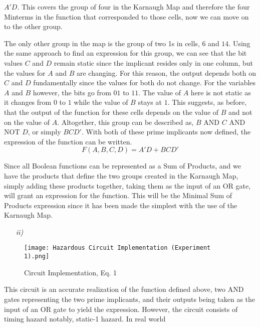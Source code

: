 \documentclass[12pt]{article}
\begin{document}
    $A'D$. This covers the group of four in the Karnaugh Map and therefore the
    four Minterms in the function that corresponded to those cells, now we can
    move on to the other group.
    \par The only other group in the map is the group of two 1s in cells, $6$
    and $14$. Using the same approach to find an expression for this group, we
    can see that the bit values $C$ and $D$ remain static since the implicant
    resides only in one column, but the values for $A$ and $B$ are changing. For
    this reason, the output depends both on $C$ and $D$ fundamentally since the
    values for both do not change. For the variables $A$ and $B$ however, the
    bits go from $01$ to $11$. The value of $A$ here is not static as it changes
    from $0$ to $1$ while the value of $B$ stays at $1$. This suggests, as
    before, that the output of the function for these cells depends on the value
    of $B$ and not on the value of $A$. Altogether, this group can be described
    as, $B$ AND $C$ AND NOT $D$, or simply $BCD'$. With both of these prime
    implicants now defined, the expression of the function can be written.
    \begin{equation}
        F\left(A,B,C,D \right) = A'D + BCD'
    \end{equation}
    \par Since all Boolean functions can be represented as a Sum of Products,
    and we have the products that define the two groups created in the Karnaugh
    Map, simply adding these products together, taking them as the input of an
    OR gate, will grant an expression for the function. This will be the Minimal
    Sum of Products expression since it has been made the simplest with the use
    of the Karnaugh Map.
    \begin{itemize}
        \item[\textit{ii)}]
    \end{itemize}
    \begin{figure}[h]
        \centering
        \texttt{[image: Hazardous Circuit Implementation
        (Experiment 1).png]}
        \caption{Circuit Implementation, Eq. 1}%
        \label{fig:1}
    \end{figure}
    \par This circuit is an accurate realization of the function defined above,
    two AND gates representing the two prime implicants, and their outputs being
    taken as the input of an OR gate to yield the expression. However, the
    circuit consists of timing hazard notably, static-1 hazard. In real world
\end{document}
